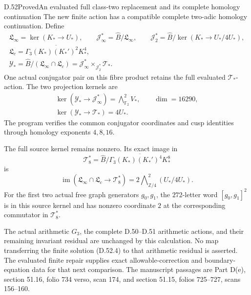 \begin{statement}{D.52}{Proved}{An evaluated full class-two replacement and its complete homology continuation}
The new finite action has a compatible complete
two-adic homology continuation. Define
\[
 \begin{gathered}
 \mathfrak L_\infty=\ker(K_*\to U_*),\qquad
 \mathcal J_\infty^*=\widehat B/\mathfrak L_\infty,\qquad
 \mathcal J_2^*=\widehat B/\ker(K_*\to U_*/4U_*),\\
 \mathfrak L_c=
       \overline{\Gamma_3(K_*)(K_*')^2K_*^4},\\
 \mathcal Y_*=
       \widehat B/(\mathfrak L_\infty\cap\mathfrak L_c)
       =\mathcal J_\infty^*
             \times_{\mathcal J_2^*}\mathcal T_* .
 \end{gathered}
 \tag{D.52.5}
\]
One actual conjugator pair on this fibre product
retains the full evaluated \(\mathcal T_*\)-action.
The two projection kernels are
\[
 \begin{gathered}
 \ker(\mathcal Y_*\to\mathcal J_\infty^*)
          =\bigwedge\nolimits^2_{\mathbb F_2}V_*,
 \qquad \dim=16290,\\
 \ker(\mathcal Y_*\to\mathcal T_*)=4U_* .
 \end{gathered}
 \tag{D.52.6}
\]
The program verifies the common conjugator
coordinates and cusp identities through
homology exponents \(4,8,16\).

The full source kernel remains nonzero.
Its exact image in
\[
 \mathcal T_8^*=
 \widehat B/
 \overline{\Gamma_3(K_*)(K_*')^4K_*^8}
\]
is
\[
 \operatorname{im}(\mathfrak L_\infty\cap\mathfrak L_c
                          \to\mathcal T_8^*)
       =2\bigwedge\nolimits^2_{\mathbb Z/4}(U_*/4U_*).
 \tag{D.52.7}
\]
For the first two actual free graph generators
\(g_0,g_1\), the \(272\)-letter word
\([g_0,g_1]^2\) is in this source kernel and
has nonzero coordinate \(2\) at the corresponding
commutator in \(\mathcal T_8^*\).

The actual arithmetic \(G_3\), the complete
D.50--D.51 arithmetic actions, and their
remaining invariant residual are unchanged
by this calculation. No map transferring
the finite solution (D.52.4) to that arithmetic
residual is asserted. The evaluated finite
repair supplies exact allowable-correction
and boundary-equation data for that next
comparison.
The manuscript passages are Part D(e),
section 51.16, folio 734 verso, scan 174,
and section 51.15, folios 725--727,
scans 156--160.
\end{statement}
